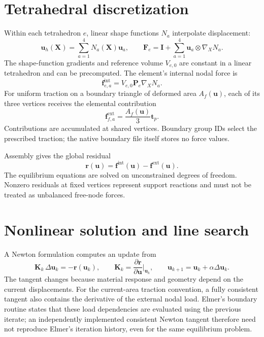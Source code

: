 \documentclass[11pt]{article}
\newcommand{\vect}[1]{\boldsymbol{#1}}
\begin{document}
\section{Tetrahedral discretization}
Within each tetrahedron $e$, linear shape functions $N_a$ interpolate displacement:
\begin{equation}
 \vect{u}_h(\vect{X})=\sum_{a=1}^{4}N_a(\vect{X})\vect{u}_a,
 \qquad
 \vect{F}_e=\vect{I}+\sum_{a=1}^{4}
       \vect{u}_a\otimes\nabla_X N_a.
\end{equation}
The shape-function gradients and reference volume $V_{e,0}$ are constant in a
linear tetrahedron and can be precomputed. The element's internal nodal force is
\begin{equation}
 \vect{f}^{\mathrm{int}}_{e,a}
 =V_{e,0}\vect{P}_e\nabla_X N_a.
\end{equation}
For uniform traction on a boundary triangle of deformed area $A_f(\vect{u})$,
each of its three vertices receives the elemental contribution
\begin{equation}
 \vect{f}^{\mathrm{ext}}_{f,a}
 =\frac{A_f(\vect{u})}{3}\vect{t}_p.
\end{equation}
Contributions are accumulated at shared vertices. Boundary group IDs select
the prescribed traction; the native boundary file itself stores no force values.

Assembly gives the global residual
\begin{equation}
 \vect{r}(\vect{u})=
 \vect{f}^{\mathrm{int}}(\vect{u})-
 \vect{f}^{\mathrm{ext}}(\vect{u}).
\end{equation}
The equilibrium equations are solved on unconstrained degrees of freedom.
Nonzero residuals at fixed vertices represent support reactions and must not be
treated as unbalanced free-node forces.

\section{Nonlinear solution and line search}
A Newton formulation computes an update from
\begin{equation}
 \vect{K}_k\,\Delta\vect{u}_k=-\vect{r}(\vect{u}_k),\qquad
 \vect{K}_k=\frac{\partial\vect{r}}{\partial\vect{u}}
             \bigg|_{\vect{u}_k},\qquad
 \vect{u}_{k+1}=\vect{u}_k+\alpha\Delta\vect{u}_k.
 \label{eq:newton}
\end{equation}
The tangent changes because material response and geometry depend on the current
displacements. For the current-area traction convention, a fully consistent
tangent also contains the derivative of the external nodal load. Elmer's boundary
routine states that these load dependencies are evaluated using the previous
iterate; an independently implemented consistent Newton tangent therefore need
not reproduce Elmer's iteration history, even for the same equilibrium problem.
\end{document}
